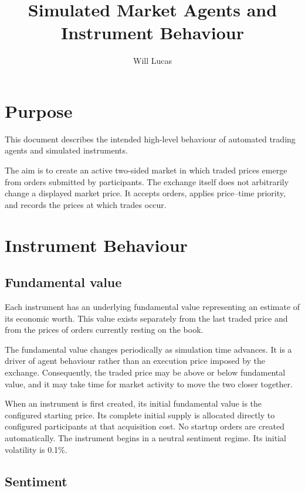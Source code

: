 \documentclass{article}
\title{Simulated Market Agents and Instrument Behaviour}
\author{Will Lucas}
\date{}
\begin{document}
\maketitle
\tableofcontents

\section{Purpose}

This document describes the intended high-level behaviour of automated
trading agents and simulated instruments.

The aim is to create an active two-sided market in which traded
prices emerge from orders submitted by participants. The exchange itself does
not arbitrarily change a displayed market price. It accepts orders, applies
price--time priority, and records the prices at which trades occur.

\section{Instrument Behaviour}

\subsection{Fundamental value}

Each instrument has an underlying fundamental value representing an estimate
of its economic worth. This value exists separately from the last traded price
and from the prices of orders currently resting on the book.

The fundamental value changes periodically as simulation time advances. It is
a driver of agent behaviour rather than an execution price imposed by the
exchange. Consequently, the traded price may be above or below fundamental
value, and it may take time for market activity to move the two closer
together.

When an instrument is first created, its initial fundamental value is the
configured starting price. Its complete initial supply is allocated directly
to configured participants at that acquisition cost. No startup orders are
created automatically. The instrument begins in a neutral sentiment regime.
Its initial volatility is 0.1\%.

\subsection{Sentiment}
\end{document}
